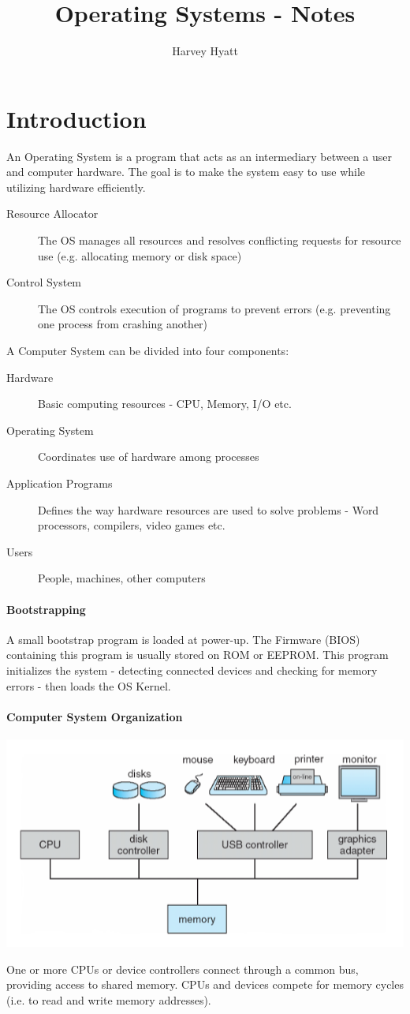 \documentclass{article}
\title{Operating Systems - Notes}
\author{Harvey Hyatt}
\date{}
\begin{document}
\maketitle

\section{Introduction}
An Operating System is a program that acts as an intermediary between a user and computer hardware. The goal is to make the system easy to use while utilizing hardware efficiently.
\begin{description}
\item[Resource Allocator] The OS manages all resources and resolves conflicting requests for resource use (e.g. allocating memory or disk space)
\item[Control System] The OS controls execution of programs to prevent errors (e.g. preventing one process from crashing another)
\end{description}
A Computer System can be divided into four components:
\begin{description}
\item[Hardware] Basic computing resources - CPU, Memory, I/O etc.
\item[Operating System] Coordinates use of hardware among processes
\item[Application Programs] Defines the way hardware resources are used to solve problems - Word processors, compilers, video games etc.
\item[Users] People, machines, other computers
\end{description}
\paragraph{Bootstrapping}
A small bootstrap program is loaded at power-up. The Firmware (BIOS) containing this program is usually stored on ROM or EEPROM. This program initializes the system - detecting connected devices and checking for memory errors - then loads the OS Kernel.
\paragraph{Computer System Organization}
\begin{center}
\includegraphics[scale=0.5]{fig1}
\end{center}
One or more CPUs or device controllers connect through a common bus, providing access to shared memory. CPUs and devices compete for memory cycles (i.e. to read and write memory addresses).
\end{document}
